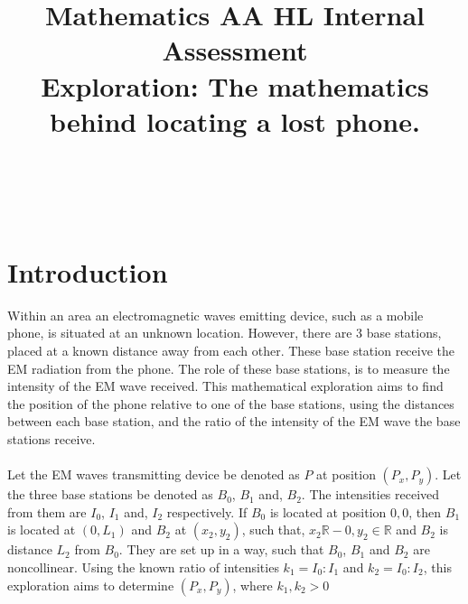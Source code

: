 \documentclass[a4paper,12pt]{article}
\begin{document}
\title{\textbf{Mathematics AA HL Internal Assessment}\\\large Exploration: The mathematics behind locating a lost phone.}
\author{~}
\date{~}
\maketitle

\newpage
\section{Introduction}
Within an area an electromagnetic waves emitting device, such as a mobile phone, is situated at an unknown location. However, there are 3 base stations, placed at a known distance away from each other. 
These base station receive the EM radiation from the phone. The role of these base stations, is to measure the intensity of the EM wave received. This mathematical exploration aims to find the position of the phone relative to one of the base stations, using the distances between each base station, and the ratio of the intensity of the EM wave the base stations receive.
\\\\
Let the EM waves transmitting device be denoted as $P$ at position $(P_x, P_y)$. Let the three base stations be denoted as $B_0$, $B_1$ and, $B_2$. The intensities received from them are $I_0$, $I_1$ and, $I_2$ respectively. If $B_0$ is located at position $0,0$, then $B_1$ is located at $(0,L_1)$ and $B_2$ at $(x_2,y_2)$, such that, $x_2 \mathbb{R}-0, y_2\in \mathbb{R}$ and $B_2$ is distance $L_2$ from $B_0$.
They are set up in a way, such that $B_0$, $B_1$ and $B_2$ are noncollinear. Using the known ratio of intensities $k_1=I_0:I_1$ and $k_2=I_0:I_2$, this exploration aims to determine $(P_x, P_y)$, where $k_1,k_2>0$
\end{document}
